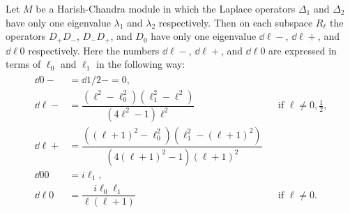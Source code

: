 \begin{proposition}\label{prop:eigenvaluesforDs}
  Let $M$ be a Harish-Chandra module in which the Laplace operators $\Delta_1$ and $\Delta_2$ have only one eigenvalue $\lambda_1$ and $\lambda_2$ respectively. Then on each subspace $R_\ell$ the operators $D_+D_-$, $D_-D_+$, and $D_0$ have only one eigenvalue $\dd{\ell}{-}$, $\dd{\ell}{+}$, and $\dd{\ell}{0}$ respectively. Here the numbers $\dd{\ell}{-}$, $\dd{\ell}{+}$, and $\dd{\ell}{0}$ are expressed in terms of $\ell_0$ and $\ell_1$ in the following way:
  \begin{align}\label{eq:dformulaeonR_l}
    \begin{aligned}
      \dd{0}{-} &= \dd{1/2}{-}=0, \\
      \dd{\ell}{-} &= \dfrac{(\ell^2-\ell_0^2)(\ell_1^2-\ell^2)}{(4\ell^2-1)\ell^2} && \mbox{if } \ell\neq 0,\tfrac{1}{2}, \\
      \dd{\ell}{+} &= \dfrac{((\ell+1)^2-\ell_0^2)(\ell_1^2-(\ell+1)^2)}{(4(\ell+1)^2-1)(\ell+1)^2} \\
      \dd{0}{0} &= i\ell_1, \\
      \dd{\ell}{0} &= \dfrac{i\ell_0\ell_1}{\ell(\ell+1)} && \mbox{if }\ell\neq 0.
    \end{aligned}
  \end{align}
\end{proposition}
